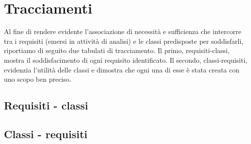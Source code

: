 \clearpage

\section{Tracciamenti}

Al fine di rendere evidente l'associazione di necessità e sufficienza che intercorre tra i requisiti (emersi in attività di analisi) e le classi predisposte per soddisfarli, riportiamo di seguito due tabulati di tracciamento. Il primo, requisiti-classi, mostra il soddisfacimento di ogni requisito identificato. Il secondo, classi-requisiti, evidenzia l'utilità delle classi e dimostra che ogni una di esse è stata creata con uno scopo ben preciso.

\subsection{Requisiti - classi}

\subsection{Classi - requisiti}


